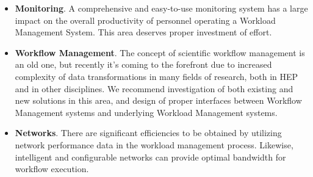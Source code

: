 \begin{itemize}

\item \textbf{Monitoring}. A comprehensive and easy-to-use monitoring system has a large impact on the overall productivity of personnel operating a Workload Management System. This area deserves proper
investment of effort.

\item \textbf{Workflow Management}. The concept of scientific workflow management is an old one, but recently it's coming to the forefront due to increased complexity
of data transformations in many fields of research, both in HEP and in other disciplines. We recommend investigation of both existing and new solutions in this area,
and design of proper interfaces between Workflow Management systems and underlying Workload Management systems.

\item \textbf{Networks}. There are significant efficiencies to be obtained by utilizing network performance data in the workload management process. Likewise,
intelligent and configurable networks can provide optimal bandwidth for workflow execution.

\end{itemize}



